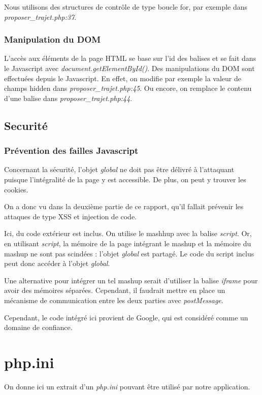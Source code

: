 \documentclass[a4paper]{article}
\begin{document}
Nous utilisons des structures de contrôle de type boucle for, par exemple
dans \textit{proposer\_trajet.php:37}.

\subsubsection{Manipulation du DOM}

L'accès aux éléments de la page HTML se base sur l'id des balises et se fait dans le Javascript
avec \textit{document.getElementById()}.
Des manipulations du DOM sont effectuées depuis le Javascript.
En effet, on modifie par exemple la valeur de champs hidden dans \textit{proposer\_trajet.php:45}.
Ou encore, on remplace le contenu d'une balise dans \textit{proposer\_trajet.php:44}.

\subsection{Securité} 

\subsubsection{Prévention des failles Javascript}

Concernant la sécurité, l'objet \textit{global} ne doit pas être délivré
à l'attaquant puisque l'intégralité de la page y est accessible. De plus,
on peut y trouver les cookies. 

On a donc vu dans la deuxième partie de ce rapport, qu'il fallait prévenir
les attaques de type XSS et injection de code.

Ici, du code extérieur est inclus. On utilise le mashhup avec la balise \textit{script}.
Or, en utilisant \textit{script}, la mémoire de la page intégrant le mashup et la mémoire du mashup 
ne sont pas scindées : l'objet \textit{global} est partagé. Le code du script inclus peut donc accéder
à l'objet \textit{global}.

Une alternative pour intégrer un tel mashup serait d'utiliser la balise \textit{iframe} pour avoir
des mémoires séparées. Cependant, il faudrait mettre en place un mécanisme de communication entre les deux
parties avec \textit{postMessage}.

Cependant, le code intégré ici provient de Google, qui est considéré comme un domaine de confiance.

\newpage
\appendix
\section{php.ini}
On donne ici un extrait d'un \textit{php.ini} pouvant être
utilisé par notre application.
\end{document}

